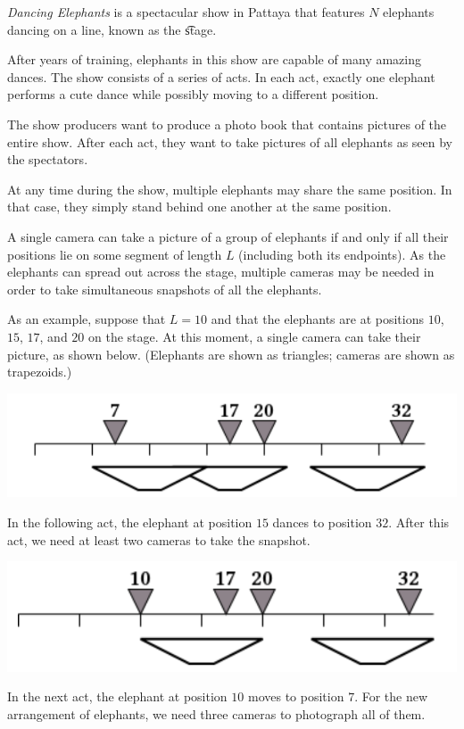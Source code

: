 \textit{Dancing Elephants} is a spectacular show in Pattaya that features $N$ elephants dancing on a line,
known as the \t{stage}.

After years of training, elephants in this show are capable of many amazing dances. The show
consists of a series of acts. In each act, exactly one elephant performs a cute dance while possibly
moving to a different position.

The show producers want to produce a photo book that contains pictures of the entire show. After each act, they want to take pictures of all elephants as seen by the spectators.

At any time during the show, multiple elephants may share the same position. In that case, they
simply stand behind one another at the same position.

A single camera can take a picture of a group of elephants if and only if all their positions lie on
some segment of length $L$ (including both its endpoints). As the elephants can spread out across
the stage, multiple cameras may be needed in order to take simultaneous snapshots of all the elephants.

As an example, suppose that $L=10$ and that the elephants are at positions $10$, $15$, $17$, and $20$ on the
stage. At this moment, a single camera can take their picture, as shown below. (Elephants are
shown as triangles; cameras are shown as trapezoids.)

\includegraphics[bb= 0 0 100 100]{elephants1.png}

In the following act, the elephant at position $15$ dances to position $32$. After this act, we need at
least two cameras to take the snapshot.

\includegraphics[bb= 0 0 100 100]{elephants2.png}

In the next act, the elephant at position $10$ moves to position $7$. For the new arrangement of elephants, we need three cameras to photograph all of them.

